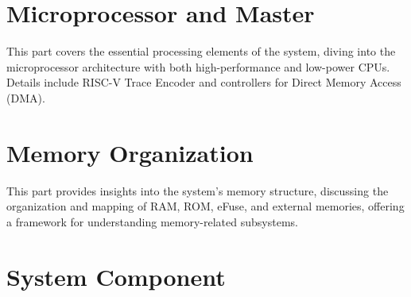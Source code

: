 \documentclass[openany, 10pt]{book}
\begin{document}
\setenglishformatting




\clearpage

\clearpage


\tableofcontents
\clearpage
\listoftables
\clearpage
\listoffigures






\part{Microprocessor and Master}


This part covers the essential processing elements of the system, diving into the microprocessor architecture with both high-performance and low-power CPUs. Details include RISC-V Trace Encoder and controllers for Direct Memory Access (DMA).


\part{Memory Organization}

This part provides insights into the system's memory structure, discussing the organization and mapping of RAM, ROM, eFuse, and external memories, offering a framework for understanding memory-related subsystems.


\part{System Component}
\end{document}
